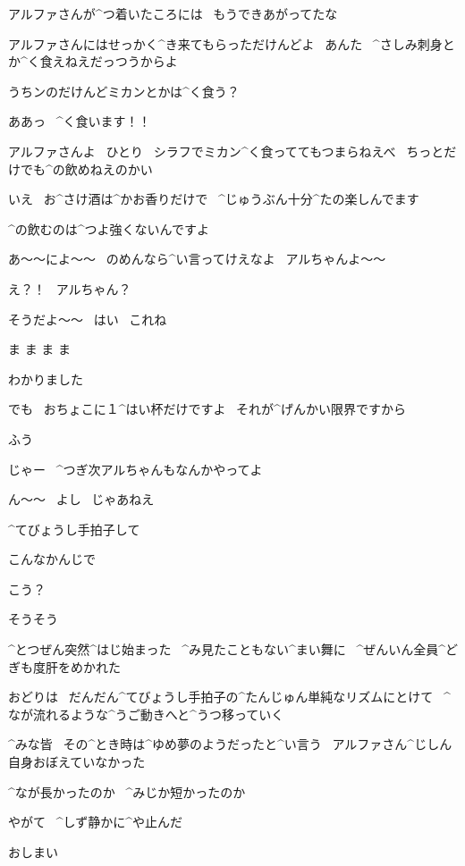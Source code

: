 \page
\Narrator アルファさんが^{つ}{着}いたころには
\ もうできあがってたな

\Person アルファさんにはせっかく^{き}{来}てもらっただけんどよ
\ あんた
\ ^{さしみ}{刺身}とか^{く}{食}えねえだっつうからよ

\Person うちンのだけんどミカンとかは^{く}{食}う？

\Alpha ああっ
\ ^{く}{食}います！！

\page
\Ojisan アルファさんよ
\ ひとり
\ シラフでミカン^{く}{食}っててもつまらねえべ
\ ちっとだけでも^{の}{飲}めねえのかい

\Alpha いえ
\ お^{さけ}{酒}は^{かお}{香}りだけで
\ ^{じゅうぶん}{十分}^{たの}{楽}しんでます

\Alpha ^{の}{飲}むのは^{つよ}{強}くないんですよ

\page
\Person あ〜〜によ〜〜
\ のめんなら^{い}{言}ってけえなよ
\ アルちゃんよ〜〜

\Alpha え？！
\ アルちゃん？

\Person そうだよ〜〜
\ はい
\ これね

\Person ま ま ま ま

\Alpha わかりました

\Alpha でも
\ おちょこに１^{はい}{杯}だけですよ
\ それが^{げんかい}{限界}ですから

\page
\Alpha ふう

\page
\Person じゃー
\ ^{つぎ}{次}アルちゃんもなんかやってよ

\Alpha ん〜〜
\ よし
\ じゃあねえ

\Alpha ^{てびょうし}{手拍子}して

\Alpha こんなかんじで

\Person こう？

\Alpha そうそう

\page[109]
\Narrator ^{とつぜん}{突然}^{はじ}{始}まった
\ ^{み}{見}たこともない^{まい}{舞}に
\ ^{ぜんいん}{全員}^{どぎも}{度肝}をめかれた

\page
\Narrator おどりは
\ だんだん^{てびょうし}{手拍子}の^{たんじゅん}{単純}なリズムにとけて
\ ^{なが}{流}れるような^{うご}{動}きへと^{うつ}{移}っていく

\page
\Narrator ^{みな}{皆}
\ その^{とき}{時}は^{ゆめ}{夢}のようだったと^{い}{言}う
\ アルファさん^{じしん}{自身}おぼえていなかった

\Narrator ^{なが}{長}かったのか
\ ^{みじか}{短}かったのか

\page
\Narrator やがて
\ ^{しず}{静}かに^{や}{止}んだ

\Alpha おしまい

